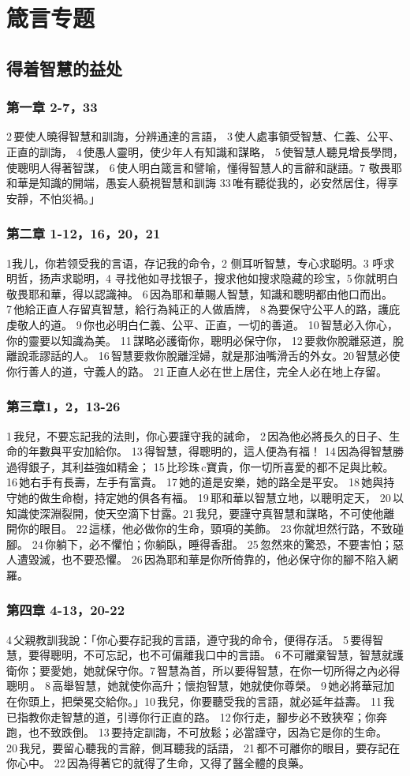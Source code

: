 \section{箴言专题}
\subsection{得着智慧的益处}
\subsubsection{第一章 2-7，33}
2 要使人曉得智慧和訓誨，分辨通達的言語， 3 使人處事領受智慧、仁義、公平、正直的訓誨， 4 使愚人靈明，使少年人有知識和謀略， 5 使智慧人聽見增長學問，使聰明人得著智謀， 6 使人明白箴言和譬喻，懂得智慧人的言辭和謎語。7 敬畏耶和華是知識的開端，愚妄人藐視智慧和訓誨 33 唯有聽從我的，必安然居住，得享安靜，不怕災禍。」
\subsubsection{第二章 1-12，16，20，21}
1我儿，你若领受我的言语，存记我的命令，2 侧耳听智慧，专心求聪明。3 呼求明哲，扬声求聪明，4 寻找他如寻找银子，搜求他如搜求隐藏的珍宝，5 你就明白敬畏耶和華，得以認識神。 6 因為耶和華賜人智慧，知識和聰明都由他口而出。 7 他給正直人存留真智慧，給行為純正的人做盾牌， 8 為要保守公平人的路，護庇虔敬人的道。 9 你也必明白仁義、公平、正直，一切的善道。 10 智慧必入你心，你的靈要以知識為美。 11 謀略必護衛你，聰明必保守你， 12 要救你脫離惡道，脫離說乖謬話的人。 16 智慧要救你脫離淫婦，就是那油嘴滑舌的外女。20 智慧必使你行善人的道，守義人的路。 21 正直人必在世上居住，完全人必在地上存留。
\subsubsection{第三章1，2，13-26}
1 我兒，不要忘記我的法則，你心要謹守我的誡命， 2 因為他必將長久的日子、生命的年數與平安加給你。 13 得智慧，得聰明的，這人便為有福！ 14 因為得智慧勝過得銀子，其利益強如精金； 15 比珍珠 c寶貴，你一切所喜愛的都不足與比較。 16 她右手有長壽，左手有富貴。 17 她的道是安樂，她的路全是平安。 18 她與持守她的做生命樹，持定她的俱各有福。 19 耶和華以智慧立地，以聰明定天， 20 以知識使深淵裂開，使天空滴下甘露。21 我兒，要謹守真智慧和謀略，不可使他離開你的眼目。 22 這樣，他必做你的生命，頸項的美飾。 23 你就坦然行路，不致碰腳。 24 你躺下，必不懼怕；你躺臥，睡得香甜。 25 忽然來的驚恐，不要害怕；惡人遭毀滅，也不要恐懼。 26 因為耶和華是你所倚靠的，他必保守你的腳不陷入網羅。
\subsubsection{第四章 4-13，20-22} 
4 父親教訓我說：「你心要存記我的言語，遵守我的命令，便得存活。 5 要得智慧，要得聰明，不可忘記，也不可偏離我口中的言語。 6 不可離棄智慧，智慧就護衛你；要愛她，她就保守你。7 智慧為首，所以要得智慧，在你一切所得之內必得聰明 。 8 高舉智慧，她就使你高升；懷抱智慧，她就使你尊榮。 9 她必將華冠加在你頭上，把榮冕交給你。」10 我兒，你要聽受我的言語，就必延年益壽。 11 我已指教你走智慧的道，引導你行正直的路。 12 你行走，腳步必不致狹窄；你奔跑，也不致跌倒。 13 要持定訓誨，不可放鬆；必當謹守，因為它是你的生命。20 我兒，要留心聽我的言辭，側耳聽我的話語， 21 都不可離你的眼目，要存記在你心中。 22 因為得著它的就得了生命，又得了醫全體的良藥。
